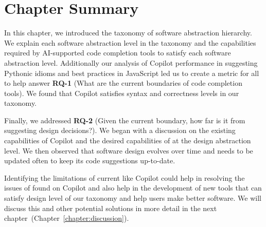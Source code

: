 \section{Chapter Summary}
In this chapter, we introduced the taxonomy of software abstraction hierarchy. We explain each software abstraction level in the taxonomy and the capabilities required by AI-supported code completion tools to satisfy each software abstraction level.
Additionally our analysis of Copilot performance in suggesting Pythonic idioms and best practices in JavaScript led us to create a metric for all \cct{} to help answer \textbf{RQ-1} (What are the current boundaries of code completion tools). We found that Copilot satisfies syntax and correctness levels in our taxonomy.

Finally, we addressed \textbf{RQ-2} (Given the current boundary, how far is it from suggesting design decisions?). We began with a discussion on the existing capabilities of Copilot and the desired capabilities of \cct{} at the design abstraction level. We then observed that software design evolves over time and \cct{} needs to be updated often to keep its code suggestions up-to-date.

Identifying the limitations of current \cct{} like Copilot could help in resolving the issues of found on Copilot and also help in the development of new tools that can satisfy design level of our taxonomy and help users make better software. We will discuss this and other potential solutions in more detail in the next chapter~(Chapter~\ref{chapter:discussion}).